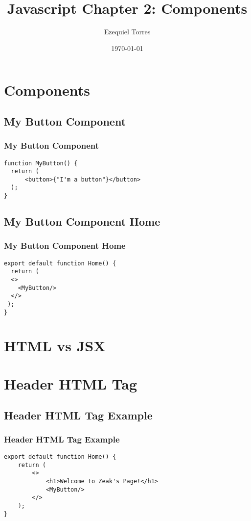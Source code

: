 \documentclass{beamer}
\begin{document}
\title{Javascript Chapter 2: Components}
\author{Ezequiel Torres}
\date{\today}
\frame{\titlepage}

\section{Components}

\begin{frame}[fragile]
\subsection{My Button Component}
\frametitle{My Button Component}
\begin{lstlisting}
function MyButton() {
  return (
      <button>{"I'm a button"}</button>
  );
}
\end{lstlisting}
\end{frame}

\begin{frame}[fragile]
\subsection{My Button Component Home}
\frametitle{My Button Component Home}
\begin{lstlisting}
export default function Home() {
  return (
  <>
    <MyButton/>
  </>
 );
}\end{lstlisting}
\end{frame}

\section{HTML vs JSX}

\section{Header HTML Tag}

\begin{frame}[fragile]
\subsection{Header HTML Tag Example}
\frametitle{Header HTML Tag Example}
\begin{lstlisting}
export default function Home() {
    return (
        <>
            <h1>Welcome to Zeak's Page!</h1>
            <MyButton/>
        </>
    );
}
\end{lstlisting}
\end{frame}
\end{document}
